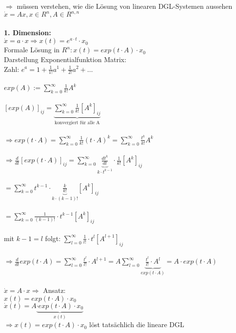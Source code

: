 $\Rightarrow$ müssen verstehen, wie die Lösung von linearen DGL-Systemen aussehen\\
$\dot{x}=Ax, x \in R^n, A \in R^{n,n}$\\\\
\textbf{1. Dimension:}\\
$\dot{x}=a \cdot x \Rightarrow x(t)=e^{a \cdot t} \cdot x_0$\\
Formale Lösung in $R^n: x(t)=exp(t \cdot A) \cdot x_0$\\
Darstellung Exponentialfunktion Matrix:\\
Zahl: $e^a=1+\frac{1}{1!}a^1 + \frac{1}{2!}a^2 + …$\\\\
$exp(A):= \displaystyle \sum_{k=0}^{\infty} \frac{1}{k!} A^k$\\\\
$[exp(A)]_{ij}= \underbrace{\sum_{k=0}^{\infty} \frac{1}{k!} [A^k]_{ij}}_{\text{konvergiert für alle A}}$\\\\
$\Rightarrow exp(t \cdot A) = \displaystyle  \sum_{k=0}^{\infty} \frac{1}{k!} (t \cdot A)^k =  \displaystyle \sum_{k=0}^{\infty} \frac{t^k}{k!} A^k$\\\\
$\Rightarrow \frac{d}{dt} [exp(t \cdot A)]_{ij}=\displaystyle \sum_{k=0}^{\infty} \underbrace{\frac{dt^k}{dt}}_{k \cdot t^{k-1}} \cdot \frac{1}{k!} [A^k]_{ij}$\\\\
$=\displaystyle \sum_{k=0}^{\infty} t^{k-1} \cdot \underbrace{\frac{k}{k!}}_{k \cdot (k-1)!} [A^k]_{ij}$\\\\
$=\displaystyle \sum_{k=0}^{\infty} \frac{1}{(k-1)!} \cdot t^{k-1} [A^k]_{ij}$\\\\
mit $k-1=l$ folgt: $\displaystyle \sum_{l=0}^{\infty} \frac{1}{l!} \cdot t^l [A^{l+1}]_{ij}$\\\\
$\Rightarrow \frac{d}{dt} exp(t \cdot A)=\displaystyle \sum_{l=0}^{\infty} \frac{t^l}{l!} \cdot A^{l+1} = A \displaystyle \sum_{l=0}^{\infty} \underbrace{\frac{t^l}{l!} \cdot A^l}_{exp(t \cdot A)}=A \cdot exp(t \cdot A)$\\\\

$\dot{x} = A \cdot x \Rightarrow$ Ansatz:\\
$x(t)=exp(t \cdot A) \cdot x_0$\\
$\dot{x}(t)=A \underbrace{\cdot exp(t \cdot A) \cdot x_0}_{x(t)}$\\
$\Rightarrow x(t)=exp(t \cdot A) \cdot x_0$ löst tatsächlich die lineare DGL\\\\

